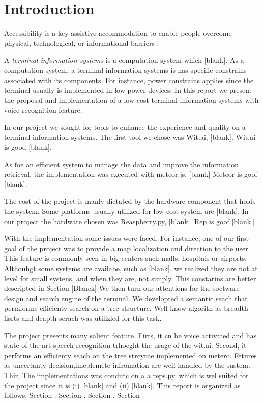 %
\chapter{Introduction}
\label{sec:intro}


Accessibility is a key assistive accommodation to enable people  overcome physical, technological, or informational barriers \cite{acessguide13}.


A \emph{terminal information systems} is a computation system which [blank].
As a computation system, a terminal information systems is has specific constrains associated with its components.
For instance, power constrains applies since the terminal usually is implemented in low power devices.
In this report we present the proposal and implementation of a low cost terminal information systems with voice recognition feature.

In our project we sought for tools to enhance the experience and quality on a terminal information systems. 
The first tool we chose was Wit.ai, [blank].
Wit.ai is good [blank].

As foe an efficient system to manage the data and improve the information retrieval, the implementation was executed with meteor.js, [blank]
Meteor is goof [blank].

The cost of the project is manly dictated by the hardware component that holds the system.
Some platforms usually utilized for low cost system are [blank].
In our project the hardware chosen was Reaspberry.py, [blank].
Rep is goof [blank.]

With the implementation some issues were faced.
For instance, one of our first goal of the project was to provide a map localization and direction to the user.
This feature is commonly seen in big centers such malls, hospitals or airports.
Althouhgt some systems are availabe, such as [blank]. we realized they are not at level for small systens, and when they are, not simply. This constarins are better descripted in Section [Blanck]
We then turn our attentions for the soctware design and search engine of the termnal.
We developted a semantic seach that permforms efficienty search on a tree structure.
Well know algorith as breadth-fisrts and deapth serach was utilizled for this task.

The project presents many salient feature.
Firts, it cn be voice activated and has state-of-the art speech recognition trhoeght the usage of the wit.ai.
Second, it performs an efficienty seach on the tree strcytue implemented on metero. 
Fetures as uncertanty decision,imcplemete infromation are well handled by the sustem.
Thir, The implementations was condutc on a a reps.py, which is wel suited for the project since it is (i) [blank] and (ii) [blank].
This report is organized as follows.
Section .
Section .
Section .
Section .


